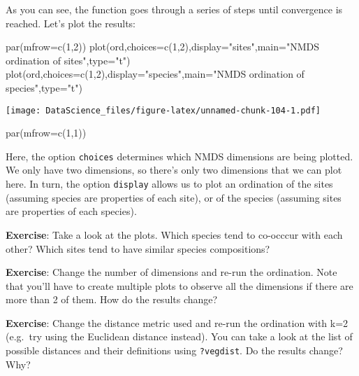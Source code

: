 \documentclass[
]{book}
\newenvironment{Shaded}{\begin{snugshade}}{\end{snugshade}}
\newcommand{\AttributeTok}[1]{\textcolor[rgb]{0.77,0.63,0.00}{#1}}
\newcommand{\DecValTok}[1]{\textcolor[rgb]{0.00,0.00,0.81}{#1}}
\newcommand{\FunctionTok}[1]{\textcolor[rgb]{0.00,0.00,0.00}{#1}}
\newcommand{\NormalTok}[1]{#1}
\newcommand{\StringTok}[1]{\textcolor[rgb]{0.31,0.60,0.02}{#1}}
\begin{document}
As you can see, the function goes through a series of steps until convergence is reached. Let's plot the results:

\begin{Shaded}
\begin{Highlighting}[]
\FunctionTok{par}\NormalTok{(}\AttributeTok{mfrow=}\FunctionTok{c}\NormalTok{(}\DecValTok{1}\NormalTok{,}\DecValTok{2}\NormalTok{))}
\FunctionTok{plot}\NormalTok{(ord,}\AttributeTok{choices=}\FunctionTok{c}\NormalTok{(}\DecValTok{1}\NormalTok{,}\DecValTok{2}\NormalTok{),}\AttributeTok{display=}\StringTok{"sites"}\NormalTok{,}\AttributeTok{main=}\StringTok{"NMDS ordination of sites"}\NormalTok{,}\AttributeTok{type=}\StringTok{"t"}\NormalTok{)}
\FunctionTok{plot}\NormalTok{(ord,}\AttributeTok{choices=}\FunctionTok{c}\NormalTok{(}\DecValTok{1}\NormalTok{,}\DecValTok{2}\NormalTok{),}\AttributeTok{display=}\StringTok{"species"}\NormalTok{,}\AttributeTok{main=}\StringTok{"NMDS ordination of species"}\NormalTok{,}\AttributeTok{type=}\StringTok{"t"}\NormalTok{)}
\end{Highlighting}
\end{Shaded}

\texttt{[image: DataScience\_files/figure-latex/unnamed-chunk-104-1.pdf]}

\begin{Shaded}
\begin{Highlighting}[]
\FunctionTok{par}\NormalTok{(}\AttributeTok{mfrow=}\FunctionTok{c}\NormalTok{(}\DecValTok{1}\NormalTok{,}\DecValTok{1}\NormalTok{))}
\end{Highlighting}
\end{Shaded}

Here, the option \texttt{choices} determines which NMDS dimensions are being plotted. We only have two dimensions, so there's only two dimensions that we can plot here. In turn, the option \texttt{display} allows us to plot an ordination of the sites (assuming species are properties of each site), or of the species (assuming sites are properties of each species).

\textbf{Exercise}: Take a look at the plots. Which species tend to co-occcur with each other? Which sites tend to have similar species compositions?

\textbf{Exercise}: Change the number of dimensions and re-run the ordination. Note that you'll have to create multiple plots to observe all the dimensions if there are more than 2 of them. How do the results change?

\textbf{Exercise}: Change the distance metric used and re-run the ordination with k=2 (e.g.~try using the Euclidean distance instead). You can take a look at the list of possible distances and their definitions using \texttt{?vegdist}. Do the results change? Why?
\end{document}
